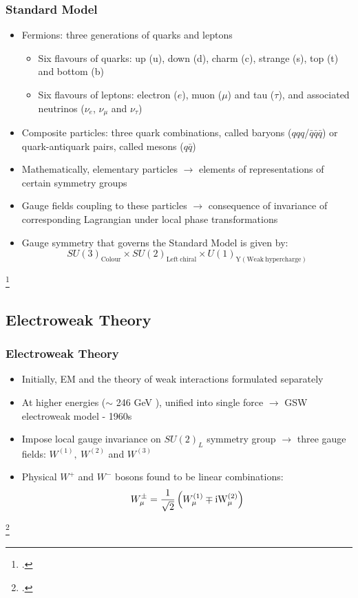 \documentclass[10pt]{beamer}
\begin{document}
\begin{frame}
\frametitle{Standard Model}
\begin{itemize}
\item Fermions: three generations of quarks and leptons
\begin{itemize}
\item Six flavours of quarks: up (u), down (d), charm (c), strange (s), top (t) and bottom (b)
\item Six flavours of leptons: electron ($e$), muon ($\mu$) and tau ($\tau$), and associated neutrinos ($\nu_{e}$, $\nu_{\mu}$ and $\nu_{\tau}$)
\end{itemize}
\item Composite particles: three quark combinations, called baryons ($qqq$/$\bar{q}\bar{q}\bar{q}$) or quark-antiquark pairs, called  mesons ($q\bar{q}$)
\item Mathematically, elementary particles $\rightarrow$ elements of representations of certain symmetry groups
\item Gauge fields coupling to these particles $\rightarrow$ consequence of invariance of corresponding Lagrangian under local phase transformations \footnotemark{}
\item Gauge symmetry that governs the Standard Model is given by: $$SU(3)_{\mathrm{Colour}}\times SU(2)_{\mathrm{Left\ chiral}}\times U(1)_{\mathrm{Y}(\mathrm{Weak \ hypercharge})}$$
\end{itemize}
\footcitetext{thomson_2013}
\end{frame}
\subsection{Electroweak Theory}
\begin{frame}
\frametitle{Electroweak Theory}
\begin{itemize}
\item Initially, EM and the theory of weak interactions formulated separately
\item At higher energies ($\sim$ 246 GeV \footnotemark{}), unified into single force $\rightarrow$ GSW electroweak model - 1960s
\item Impose local gauge invariance on $SU(2)_{L}$ symmetry group $\rightarrow$ three gauge fields: $W^{(1)},\ W^{(2)}$ and $W^{(3)}$
\item Physical $W^{+}$ and $W^{-}$ bosons found to be linear combinations: 
\begin{equation}
W^{\pm}_{\mu}=\dfrac{1}{\sqrt{2}}\left(W^{(1)}_{\mu}\mp \rm{i}W^{(2)}_{\mu}\right)
\end{equation}
\end{itemize}
\footcitetext{pdg-ew}
\end{frame}
\end{document}

